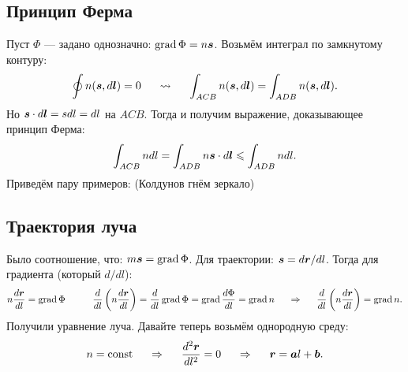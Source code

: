 \subsection*{Принцип Ферма}
Пуст $\Phi$ --- задано однозначно: $\mathop{\mathrm{grad}}\nolimits \Phi = n \mbox{\boldmath $s$}$.
Возьмём интеграл по замкнутому контуру:
\begin{equation*}
	\oint n(\mbox{\boldmath $s$}, d \mbox{\boldmath $l$}) = 0
	\hspace{0.5 cm}
	\leadsto
	\hspace{0.5 cm}
	\int_{A C B} n(\mbox{\boldmath $s$}, d \mbox{\boldmath $l$}) = \int_{A D B} n(\mbox{\boldmath $s$}, d \mbox{\boldmath $l$}).
\end{equation*}
Но $\mbox{\boldmath $s$} \cdot d \mbox{\boldmath $l$} = s d l = d l$ на $A C B$. Тогда и получим выражение, доказывающее принцип Ферма:
\begin{equation*}
	\int_{A C B} n d l = \int_{A D B} n \mbox{\boldmath $s$} \cdot d \mbox{\boldmath $l$} \leqslant \int_{A D B} n d l.
\end{equation*}
Приведём пару примеров: (Колдунов гнём зеркало)

\subsection*{Траектория луча}
Было соотношение, что: $m \mbox{\boldmath $s$} = \mathop{\mathrm{grad}}\nolimits \Phi$. Для траектории: $\mbox{\boldmath $s$} = d \mbox{\boldmath $r$}/ d l$.
Тогда для градиента (который $d / d l$):
\begin{equation*}
	n \frac{d \mbox{\boldmath $r$}}{d l} = \mathop{\mathrm{grad}}\nolimits \Phi
	\hspace{1 cm}
	\frac{d}{d l} \left(n \frac{d \mbox{\boldmath $r$}}{d l}\right) = \frac{d}{d l} \mathop{\mathrm{grad}}\nolimits \Phi = \mathop{\mathrm{grad}}\nolimits \frac{d \Phi}{d l} = \mathop{\mathrm{grad}}\nolimits n
	\hspace{0.5 cm}
	\Rightarrow
	\hspace{0.5 cm}
	\frac{d}{d l}\left(n \frac{d \mbox{\boldmath $r$}}{d l}\right) = \mathop{\mathrm{grad}}\nolimits n.
\end{equation*}
Получили уравнение луча. Давайте теперь возьмём однородную среду:
\begin{equation*}
	 n = \text{const} 
	\hspace{0.5 cm}
	\Rightarrow
	\hspace{0.5 cm}
	 \frac{d ^2 \mbox{\boldmath $r$}}{d l^2} = 0
	 \hspace{0.5 cm}
	\Rightarrow
	\hspace{0.5 cm}
	 \mbox{\boldmath $r$} = \mbox{\boldmath $a$} l + \mbox{\boldmath $b$}.	
\end{equation*}

